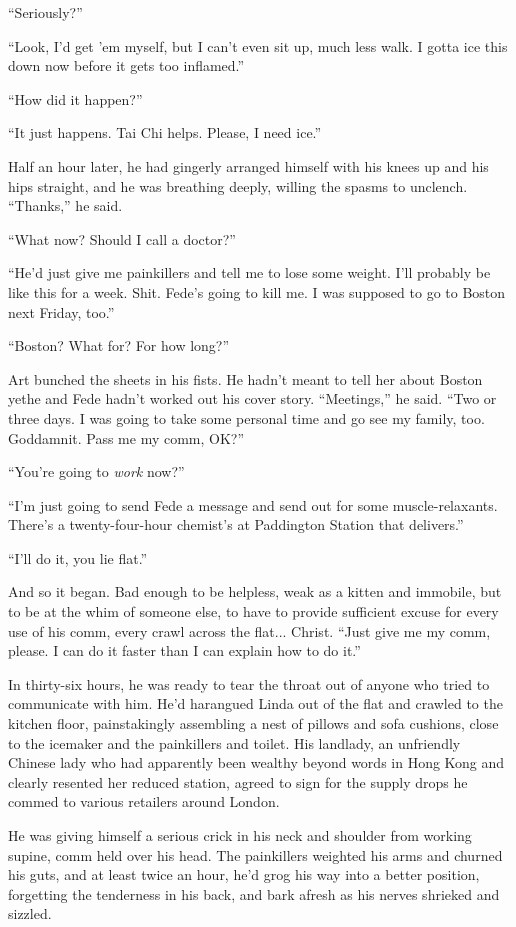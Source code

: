 “Seriously?”

“Look, I’d get ’em myself, but I can’t even sit up, much less walk.
I gotta ice this down now before it gets too inflamed.”

“How did it happen?”

“It just happens. Tai Chi helps. Please, I need ice.”

Half an hour later, he had gingerly arranged himself with his knees
up and his hips straight, and he was breathing deeply, willing the
spasms to unclench. “Thanks,” he said.

“What now? Should I call a doctor?”

“He’d just give me painkillers and tell me to lose some weight.
I’ll probably be like this for a week. Shit. Fede’s going to kill
me. I was supposed to go to Boston next Friday, too.”

“Boston? What for? For how long?”

Art bunched the sheets in his fists. He hadn’t meant to tell her
about Boston yet{\dash}he and Fede hadn’t worked out his cover story.
“Meetings,” he said. “Two or three days. I was going to take some
personal time and go see my family, too. Goddamnit. Pass me my
comm, OK?”

“You’re going to \emph{work} now?”

“I’m just going to send Fede a message and send out for some
muscle-relaxants. There’s a twenty-four-hour chemist’s at
Pad\-dington Station that delivers.”

“I’ll do it, you lie flat.”

And so it began. Bad enough to be helpless, weak as a kitten and
immobile, but to be at the whim of someone else, to have to provide
sufficient excuse for every use of his comm, every crawl across the
flat... Christ. “Just give me my comm, please. I can do it faster
than I can explain how to do it.”

In thirty-six hours, he was ready to tear the throat out of anyone
who tried to communicate with him. He’d harangued Linda out of the
flat and crawled to the kitchen floor, painstakingly assembling a
nest of pillows and sofa cushions, close to the icemaker and the
painkillers and toilet. His landlady, an unfriendly Chinese lady
who had apparently been wealthy beyond words in Hong Kong and
clearly resented her reduced station, agreed to sign for the supply
drops he commed to various retailers around London.

He was giving himself a serious crick in his neck and shoulder from
working supine, comm held over his head. The painkillers weighted
his arms and churned his guts, and at least twice an hour, he’d
grog his way into a better position, forgetting the tenderness in
his back, and bark afresh as his nerves shrieked and sizzled.

